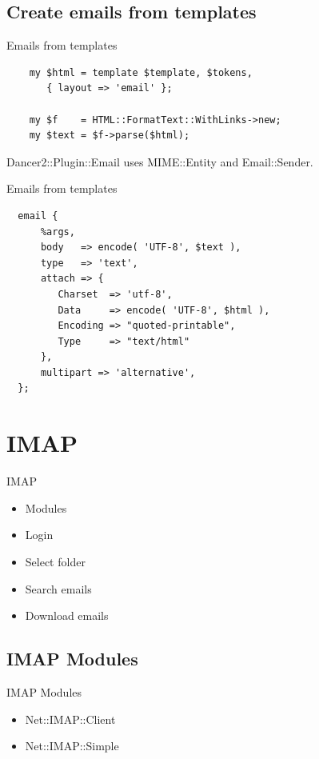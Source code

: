 \subsection{Create emails from templates}

\begin{frame}[fragile]{Emails from templates}
  \begin{verbatim}
    my $html = template $template, $tokens,
       { layout => 'email' };

    my $f    = HTML::FormatText::WithLinks->new;
    my $text = $f->parse($html);
  \end{verbatim}
\end{frame}

Dancer2::Plugin::Email uses MIME::Entity and Email::Sender.

\begin{frame}[fragile]{Emails from templates}
\begin{verbatim}
  email {
      %args,
      body   => encode( 'UTF-8', $text ),
      type   => 'text',
      attach => {
         Charset  => 'utf-8',
         Data     => encode( 'UTF-8', $html ),
         Encoding => "quoted-printable",
         Type     => "text/html"
      },
      multipart => 'alternative',
  };
\end{verbatim}
\end{frame}

\section{IMAP}

\begin{frame}{IMAP}
  \begin{itemize}
  \item Modules
  \item Login
  \item Select folder
  \item Search emails
  \item Download emails
  \end{itemize}
\end{frame}

\subsection{IMAP Modules}

\begin{frame}{IMAP Modules}
  \begin{itemize}
  \item Net::IMAP::Client
  \item Net::IMAP::Simple
  \end{itemize}
\end{frame}

